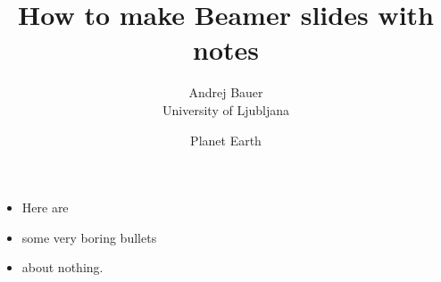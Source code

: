 \usepackage{palatino}

\title{How to make Beamer slides with notes}
\author{Andrej Bauer\\University of Ljubljana}
\date{\small Planet Earth}



\begin{frame}
  \titlepage

\end{frame}

\begin{frame}

  \begin{itemize}
  \item Here are
  \item some very boring bullets
  \item about nothing.
  \end{itemize}
  


\end{frame}


